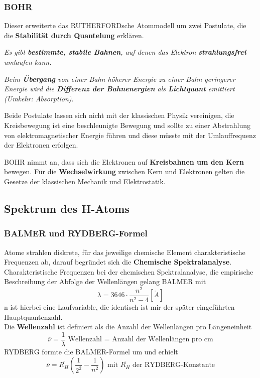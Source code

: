 \documentclass[12pt,a4paper,ngerman]{article}
\begin{document}
\subsubsection*{BOHR}
Dieser erweiterte das RUTHERFORDsche Atommodell um zwei Postulate, die die \textbf{Stabilität durch Quantelung} erklären.
\begin{center}
 \textit{Es gibt \textbf{bestimmte, stabile Bahnen}, auf denen das Elektron \textbf{strahlungsfrei} umlaufen kann.}
 \end{center} 
 
 \begin{center}
 \textit{Beim \textbf{Übergang} von einer Bahn höherer Energie zu einer Bahn geringerer Energie wird die \textbf{Differenz der Bahnenergien} als \textbf{Lichtquant} emittiert (Umkehr: Absorption)}. 
 \end{center}
 
 Beide Postulate lassen sich nicht mit der klassischen Physik vereinigen, die Kreisbewegung ist eine beschleunigte Bewegung und sollte zu einer Abstrahlung von elektromagnetischer Energie führen und diese müsste mit der Umlauffrequenz der Elektronen erfolgen. 
 
BOHR nimmt an, dass sich die Elektronen auf \textbf{Kreisbahnen um den Kern} bewegen. Für die \textbf{Wechselwirkung} zwischen Kern und Elektronen gelten die Gesetze der klassischen Mechanik und Elektrostatik.  
 

\subsection{Spektrum des H-Atoms}

\subsubsection*{BALMER und RYDBERG-Formel}

Atome strahlen diskrete, für das jeweilige chemische Element charakteristische Frequenzen ab, darauf begründet sich die \textbf{Chemische Spektralanalyse}. \\
Charakteristische Frequenzen bei der chemischen Spektralanalyse, die empirische Beschreibung der Abfolge der Wellenlängen gelang BALMER mit 
\begin{equation}
\lambda = 3646 \cdot \frac{n^2}{n^2 - 4}[\mathring{A}]
\end{equation}
n ist hierbei eine Laufvariable, die identisch ist mir der später eingeführten Hauptquantenzahl. \\
Die \textbf{Wellenzahl} ist definiert als die Anzahl der Wellenlängen pro Längeneinheit
\begin{equation}
\overline{\nu} = \frac{1}{\lambda} \text{ Wellenzahl = Anzahl der Wellenlängen pro cm}
\end{equation}
RYDBERG formte die BALMER-Formel um und erhielt
\begin{equation}
\overline{\nu} = \overline{R_H}\left( \frac{1}{2^2}- \frac{1}{n^2}\right)\text{ mit } \overline{R_H} \text{ der RYDBERG-Konstante}
\end{equation}
\end{document}
